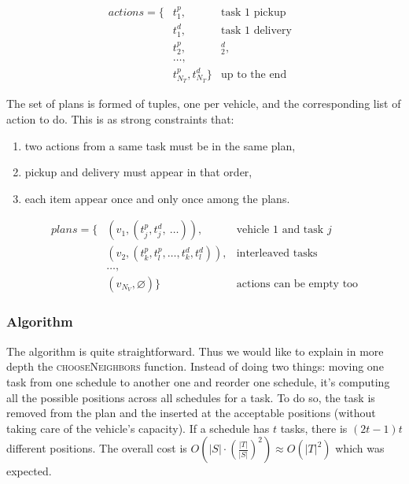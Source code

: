 \documentclass[11pt,a4paper]{article}
\begin{document}
\begin{align*}
actions = \{&t_1^p,                               & \text{task $1$ pickup} \\
            &t_1^d,                               & \text{task $1$ delivery} \\
            &t_2^p, &_2^d,                        & \\
            &\dots,                               & \\
            &t_{N_T}^p, t_{N_T}^d\}               & \text{up to the end}
\end{align*}

The set of plans is formed of tuples, one per vehicle, and the corresponding
list of action to do. This is as strong constraints that:

\begin{enumerate}
    \item two actions from a same task must be in the same plan,

    \item pickup and delivery must appear in that order,

    \item each item appear once and only once among the plans.
\end{enumerate}

\begin{align*}
plans = \{&(v_1, (t_j^p, t_j^d, \: \dots)),            & \text{vehicle $1$ and task $j$} \\
          &(v_2, (t_k^p, t_l^p, \dots, t_k^d, t_l^d)), & \text{interleaved tasks} \\
          &\dots,                                      & \\
          &(v_{N_V}, \varnothing)\}                    & \text{actions can be empty too}
\end{align*}

\subsubsection*{Algorithm}

The algorithm is quite straightforward. Thus we would like to explain in more
depth the \textsc{chooseNeighbors} function. Instead of doing two things:
moving one task from one schedule to another one and reorder one schedule, it's
computing all the possible positions across all schedules for a task. To do so,
the task is removed from the plan and the inserted at the acceptable positions
(without taking care of the vehicle's capacity). If a schedule has $t$ tasks,
there is $(2t - 1)t$ different positions. The overall cost is $O(|S| \cdot
(\frac{|T|}{|S|})^2) \approx O(|T|^2)$ which was expected.
\end{document}
